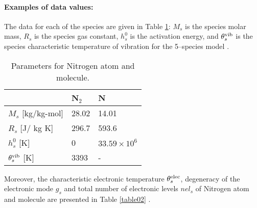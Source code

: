 \paragraph{Examples of data values:}
The data for each of the species are given in Table \ref{table01}: $M_s$ is the species molar mass,   $R_s$ is the species gas constant, $h^0_s$ is the activation energy, and $\theta^{\text{vib}}_{s}$ is the species characteristic temperature of vibration for the 5--species model \citep{Kessler2004}.
\begin{table}[htb]
\small
\caption{Parameters for Nitrogen atom and molecule.}
\centering
\begin{tabular}{l l l}
\hline\hline
 &     N$_2$     &  N  \\ [0.25ex]
\hline 
$M_s$ [kg/kg-mol]  & 28.02     &14.01               \vspace{2pt} \\
$R_s$ [J/ kg K]    & 296.7    &593.6               \vspace{2pt}\\
$h^0_s$ [K]        & 0        &$33.59\times 10^6$  \vspace{2pt}\\
$\theta^{\text{vib}}_{s}$ [K] & 3393     &-                    \vspace{2pt}\\
\hline
\end{tabular}
\label{table01}
\end{table}

Moreover, the characteristic electronic temperature $\theta^{\text{elec}}_s$, degeneracy of the electronic mode  $g_s$ and total number of electronic levels $nel_s$ of Nitrogen atom and molecule are presented in Table \ref{table02} \citep{Kirk2009}.


